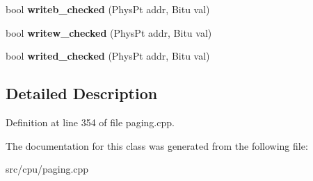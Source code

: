 \begin{DoxyCompactItemize}
\item 
\hypertarget{classPageFoilHandler_a6da0b95977688171ce76cdd7e1f9e92e}{bool {\bfseries writeb\-\_\-checked} (Phys\-Pt addr, Bitu val)}\label{classPageFoilHandler_a6da0b95977688171ce76cdd7e1f9e92e}

\item 
\hypertarget{classPageFoilHandler_a73568f447018da5957bad2ff90adbb5d}{bool {\bfseries writew\-\_\-checked} (Phys\-Pt addr, Bitu val)}\label{classPageFoilHandler_a73568f447018da5957bad2ff90adbb5d}

\item 
\hypertarget{classPageFoilHandler_ac8ea0331f5b106050c7d3ff801c4bdf3}{bool {\bfseries writed\-\_\-checked} (Phys\-Pt addr, Bitu val)}\label{classPageFoilHandler_ac8ea0331f5b106050c7d3ff801c4bdf3}

\end{DoxyCompactItemize}


\subsection{Detailed Description}


Definition at line 354 of file paging.\-cpp.



The documentation for this class was generated from the following file\-:\begin{DoxyCompactItemize}
\item 
src/cpu/paging.\-cpp\end{DoxyCompactItemize}
